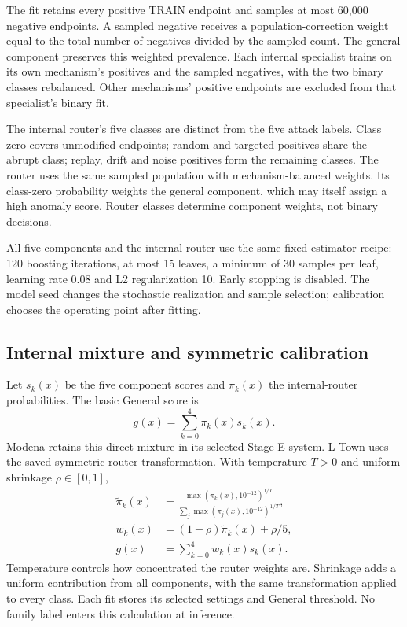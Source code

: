 The fit retains every positive TRAIN endpoint and samples at most 60,000 negative endpoints. A sampled negative receives a population-correction weight equal to the total number of negatives divided by the sampled count. The general component preserves this weighted prevalence. Each internal specialist trains on its own mechanism's positives and the sampled negatives, with the two binary classes rebalanced. Other mechanisms' positive endpoints are excluded from that specialist's binary fit.

The internal router's five classes are distinct from the five attack labels. Class zero covers unmodified endpoints; random and targeted positives share the abrupt class; replay, drift and noise positives form the remaining classes. The router uses the same sampled population with mechanism-balanced weights. Its class-zero probability weights the general component, which may itself assign a high anomaly score. Router classes determine component weights, not binary decisions.

All five components and the internal router use the same fixed estimator recipe: 120 boosting iterations, at most 15 leaves, a minimum of 30 samples per leaf, learning rate 0.08 and L2 regularization 10. Early stopping is disabled. The model seed changes the stochastic realization and sample selection; calibration chooses the operating point after fitting.

\subsection{Internal mixture and symmetric calibration}
Let $s_k(x)$ be the five component scores and $\pi_k(x)$ the internal-router probabilities. The basic General score is
\begin{equation}
 g(x)=\sum_{k=0}^{4}\pi_k(x)s_k(x).
\end{equation}
Modena retains this direct mixture in its selected Stage-E system. L-Town uses the saved symmetric router transformation. With temperature $T>0$ and uniform shrinkage $\rho\in[0,1]$,
\begin{align}
 \widetilde\pi_k(x)&=\frac{\max(\pi_k(x),10^{-12})^{1/T}}
 {\sum_j\max(\pi_j(x),10^{-12})^{1/T}},\\
 w_k(x)&=(1-\rho)\widetilde\pi_k(x)+\rho/5,\\
 g(x)&=\sum_{k=0}^{4}w_k(x)s_k(x).
 \label{eq:generalcal}
\end{align}
Temperature controls how concentrated the router weights are. Shrinkage adds a uniform contribution from all components, with the same transformation applied to every class. Each fit stores its selected settings and General threshold. No family label enters this calculation at inference.

